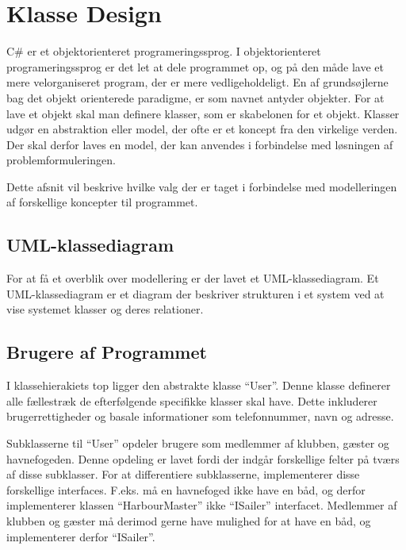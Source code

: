\section{Klasse Design}
\label{sec:klasse_design}
C\# er et objektorienteret programeringssprog. I objektorienteret programeringssprog er det let at dele programmet op, og på den måde lave et mere velorganiseret program, der er mere vedligeholdeligt. En af grundsøjlerne bag  det objekt orienterede paradigme, er som navnet antyder objekter. For at lave et objekt skal man definere klasser, som er skabelonen for et objekt. Klasser udgør en abstraktion eller model, der ofte er et koncept fra den virkelige verden. Der skal derfor laves en model, der kan anvendes i forbindelse med løsningen af problemformuleringen.

Dette afsnit vil beskrive hvilke valg der er taget i forbindelse med modelleringen af forskellige koncepter til programmet.

\subsection{UML-klassediagram}
For at få et overblik over modellering er der lavet et UML-klassediagram. Et UML-klassediagram er et diagram der beskriver strukturen i et system ved at vise systemet klasser og deres relationer.



\subsection{Brugere af Programmet}
\label{sub:brugere_af_programmet}

I klassehierakiets top ligger den abstrakte klasse \enquote{User}. Denne klasse definerer alle fællestræk de efterfølgende specifikke klasser skal have. Dette inkluderer brugerrettigheder og basale informationer som telefonnummer, navn og adresse.

Subklasserne til \enquote{User} opdeler brugere som medlemmer af klubben, gæster og havnefogeden. Denne opdeling er lavet fordi der indgår forskellige felter på tværs af disse subklasser. For at differentiere subklasserne, implementerer disse forskellige interfaces. F.eks. må en havnefoged ikke have en båd, og derfor implementerer klassen \enquote{HarbourMaster} ikke \enquote{ISailer} interfacet. Medlemmer af klubben og gæster må derimod gerne have mulighed for at have en båd, og implementerer derfor \enquote{ISailer}.

